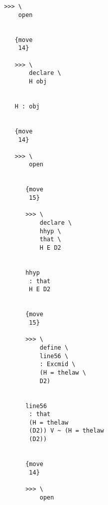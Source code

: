 \documentclass[12pt]{article}
\begin{document}
\begin{verbatim}
                                       >>> \
                                           open


                                          {move 
                                           14}

                                          >>> \
                                              declare \
                                              H obj


                                          H : obj


                                          {move 
                                           14}

                                          >>> \
                                              open


                                             {move 
                                              15}

                                             >>> \
                                                 declare \
                                                 hhyp \
                                                 that \
                                                 H E D2


                                             hhyp 
                                              : that 
                                              H E D2


                                             {move 
                                              15}

                                             >>> \
                                                 define \
                                                 line56 \
                                                 : Excmid \
                                                 (H = thelaw \
                                                 D2)


                                             line56 
                                              : that 
                                              (H = thelaw 
                                              (D2)) V ~ (H = thelaw 
                                              (D2))


                                             {move 
                                              14}

                                             >>> \
                                                 open



\end{verbatim}
\end{document}
